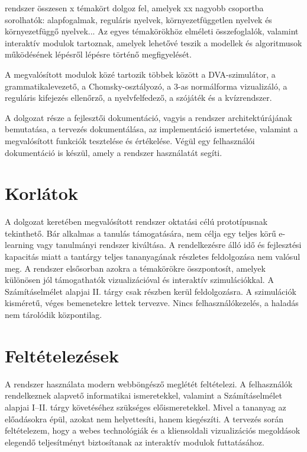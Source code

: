 \documentclass[12pt,a4paper]{report}
\begin{document}
rendszer összesen x témakört dolgoz fel, amelyek xx nagyobb csoportba sorolhatók: 
alapfogalmak, reguláris nyelvek, környezetfüggetlen nyelvek és környezetfüggő nyelvek...
 Az egyes témakörökhöz elméleti összefoglalók, valamint interaktív modulok tartoznak, 
 amelyek lehetővé teszik a modellek és algoritmusok működésének lépésről lépésre történő megfigyelését.
 
A megvalósított modulok közé tartozik többek között a DVA-szimulátor, a grammatikalevezető, a Chomsky-osztályozó, a 3-as normálforma vizualizáló, a reguláris kifejezés ellenőrző, a nyelvfelfedező, a szójáték és a kvízrendszer.


A dolgozat része a fejlesztői dokumentáció, vagyis
a rendszer architektúrájának bemutatása, a tervezés
dokumentálása, az implementáció ismertetése, valamint a megvalósított
funkciók tesztelése és értékelése. Végül egy felhasználói dokumentáció
is készül, amely a rendszer használatát segíti.

\section{Korlátok}

A dolgozat keretében megvalósított rendszer oktatási célú
prototípusnak tekinthető. Bár alkalmas a tanulás támogatására, nem
célja egy teljes körű e-learning vagy tanulmányi rendszer kiváltása.
A rendelkezésre álló idő és fejlesztési kapacitás miatt a tantárgy teljes
 tananyagának részletes feldolgozása nem valósul meg. 
 A rendszer elsősorban azokra a témakörökre összpontosít, amelyek különösen jól támogathatók vizualizációval
  és interaktív szimulációkkal.
A Számításelmélet alapjai II. tárgy csak részben kerül feldolgozásra.
A szimulációk kisméretű, véges bemenetekre lettek tervezve.
Nincs felhasználókezelés, a haladás nem tárolódik központilag.

\section{Feltételezések}

A rendszer használata modern webböngésző meglétét feltételezi. A
felhasználók rendelkeznek alapvető informatikai ismeretekkel, valamint
a Számításelmélet alapjai I--II. tárgy követéséhez szükséges
előismeretekkel. Mivel a tananyag az előadásokra épül, azokat nem
helyettesíti, hanem kiegészíti. A tervezés során feltételezem, hogy a webes
technológiák és a kliensoldali vizualizációs megoldások elegendő
teljesítményt biztosítanak az interaktív modulok futtatásához.
\end{document}
